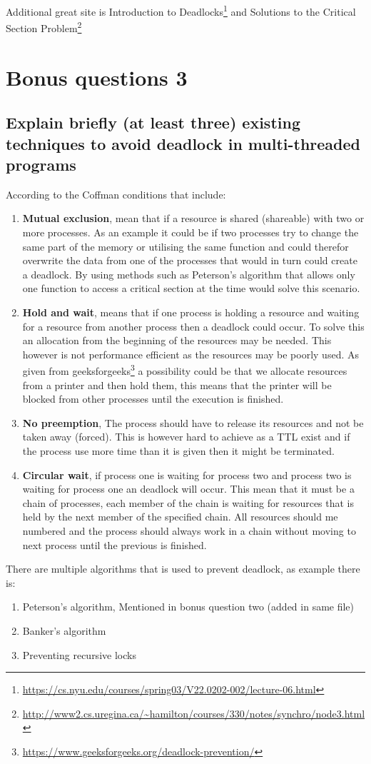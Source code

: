 \documentclass[../../../main.tex]{subfiles}
\begin{document}
Additional great site is Introduction to Deadlocks\footnote{\url{https://cs.nyu.edu/courses/spring03/V22.0202-002/lecture-06.html}} and Solutions to the Critical Section Problem\footnote{\url{http://www2.cs.uregina.ca/~hamilton/courses/330/notes/synchro/node3.html}}


\section{Bonus questions 3}
\subsection{Explain briefly (at least three) existing techniques to avoid deadlock in multi-threaded programs}
According to the Coffman conditions that include: 
\begin{enumerate}
    \item \textbf{Mutual exclusion}, mean that if a resource is shared (shareable) with two or more processes. As an example it could be if two processes try to change the same part of the memory or utilising the same function and could therefor overwrite the data from one of the processes that would in turn could create a deadlock. By using methods such as Peterson’s algorithm that allows only one function to access a critical section at the time would solve this scenario.
    
    \item \textbf{Hold and wait}, means that if one process is holding a resource and waiting for a resource from another process then a deadlock could occur. To solve this an allocation from the beginning of the resources may be needed. This however is not performance efficient as the resources may be poorly used. As given from geeksforgeeks\footnote{\url{https://www.geeksforgeeks.org/deadlock-prevention/}} a possibility could be that we allocate resources from a printer and then hold them, this means that the printer will be blocked from other processes until the execution is finished.
    \item \textbf{No preemption}, The process should have to release its resources and not be taken away (forced). This is however hard to achieve as a TTL exist and if the process use more time than it is given then it might be terminated.
    \item \textbf{Circular wait}, if process one is waiting for process two and process two is waiting for process one an deadlock will occur. This mean that it must be a chain of processes, each member of the chain is waiting for resources that is held by the next member of the specified chain. All resources should me numbered and the process should always work in a chain without moving to next process until the previous is finished. 
\end{enumerate}

There are multiple algorithms that is used to prevent deadlock, as example there is:
\begin{enumerate}
    \item Peterson’s algorithm, Mentioned in bonus question two (added in same file)
    \item Banker's algorithm
    \item Preventing recursive locks
    
\end{enumerate}
\end{document}
